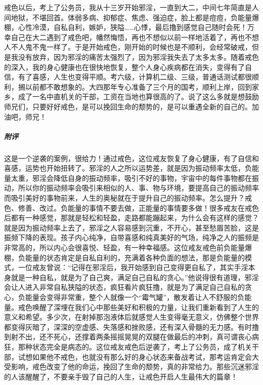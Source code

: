\begin{case}
    戒色以后，考上了公务员，我从十三岁开始邪淫，一直到大二，中间七年简直是人间地狱，不堪回首。体弱多病、抑郁症、焦虑、强迫症，脸上都是痘痘，负能量爆棚，心性冷漠，自私自利，嫉妒，狭隘……心悸，最后撸到感觉自己随时会死！万幸自己在大二遇到了戒色吧，幡然悔悟，再也不想似以前一样地活着了，再也不想人不人鬼不鬼一样了。于是开始戒色，刚开始的时候也是不顺利，会经常破戒，但是我没有放弃，因为邪淫的痛苦太强烈了，因为邪淫我失去了太多太多。随着戒色的深入，我的身心健康也在很快地恢复，整个人身心疾病都在消失，变得有了自信，有了喜感，人生也变得平顺。考六级，计算机二级、三级，普通话测试都很顺利，搁以前都不敢想象的。大四那年专心准备了三个月的国考，顺利上岸，回到家乡，成了一名中直机关的干部，工资在当地也算很高的了。说了这么多就是想鼓励师兄们，只要好好戒色，是可以挽回生命的颓势的，是可以重遇全新的自己的。加油吧，师兄！
    \subparagraph{附评} 这是一个逆袭的案例，很给力！通过戒色，这位戒友恢复了身心健康，有了自信和喜感，运势也开始扭转了。邪淫的人之所以运势差，就是因为振动频率太低，负能量太重，邪淫会降低自身的振动频率，吸引不好的事物，宇宙中的每件事物都在振动，所以你的振动频率会吸引来相似的人、事、物与环境，要提高自己的振动频率而吸引美好的事物前来，人生的奥秘就在于提升自己的振动频率。怎么提升？戒色、修善、改过。负能量的事情不要去做，正能量的事情要多做！很多戒友在戒色后都有一种感觉，那就是轻松和轻盈，走路都能蹦起来，为什么会有这样的感觉？就是因为振动频率上去了，邪淫之人容易感到沉重，不开心，甚至愁眉苦脸，这是振频下降的表现。孩子内心纯净，自带喜感和纯真美好的气场，纯净之人的振频是非常高的，所以内心会很喜悦、轻盈，有一种幸福感。这位戒友戒色前负能量爆棚，负能量的状态肯定是自私自利的，充满着各种负面的想法，那是负能量的模式，一位戒友曾说：“记得在邪淫后，我开始感到自己变得更自私了，其实手淫本身就是一种自私，就是为了自己爽，满足自己自私的贪心。”他说得很有道理，邪淫会让人进入非常自私狭隘的状态，疯狂看片疯狂撸，就是为了满足自己自私的贪心，负能量会变得非常重，整个人就像一个“霉气罐”，散发着让人不舒服的负能量。戒色唤醒了深埋在我们心中那些美好和积极的力量，让我们重新看到了人生的意义和希望。多少次，在射掉那泡液体后就感觉人生变得毫无意义，仿佛整个世界都变得灰暗了，深深的空虚感、失落感和挫败感，还有深入骨髓的无力感。有时撸到射不出，还不死心，还撑着两条摇摇晃晃的双腿在做最后的冲刺，真可谓丧心病狂，那种状态完全是病态的。这位戒友戒色后逆袭了，考上了公务员，成了机关干部，试想如果他不戒色，也就没有那么好的身心状态来备战考试，那考运肯定会大受影响，戒色改变了他的命运，挽回了生命的颓势，真的非常给力。那些沉迷邪淫的人该醒醒了，不要亲手毁了自己的人生，让戒色开启人生最伟大的篇章！
\end{case}

